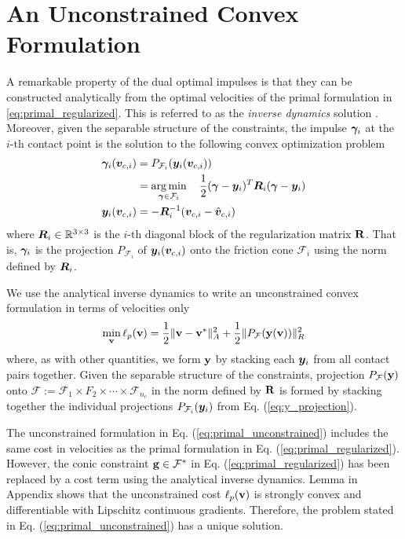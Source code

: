 \section{An Unconstrained Convex Formulation}
\label{sec:unconstrained_convex_formulation}

A remarkable property of the dual optimal impulses is that they
can be constructed analytically from the optimal velocities of the primal
formulation in \eqref{eq:primal_regularized}. This is referred to as the
\textit{inverse dynamics} solution \cite{bib:todorov2014}. Moreover, given the
separable structure of the constraints, the impulse ${\bm\gamma}_i$ at the
$i\text{-th}$ contact point is the solution to the following convex optimization
problem
\begin{equation}
	\begin{aligned}
	\bgamma_i(\vf{v}_{c,i})&= P_{\mathcal{F}_i}(\vf{y}_i(\vf{v}_{c,i}))\\
	&= \argmin_{\bgamma\in\mathcal{F}_i} \quad 
		\frac{1}{2}(\bgamma-\vf{y}_i)^T\vf{R}_i(\bgamma-\vf{y}_i)\\
	\vf{y}_i(\vf{v}_{c,i}) &= -\vf{R}_i^{-1}(\vf{v}_{c,i}-\hat{\vf{v}}_{c,i})	
	\end{aligned}
	\label{eq:y_projection}
\end{equation}
where ${\bm{R}}_i\in\mathbb{R}^{3\times3}$ is the $i\text{-th}$ diagonal block of
the regularization matrix ${\mathbf{R}}$. That is, ${\bm\gamma}_i$ is the projection
$P_{\mathcal{F}_i}$ of ${\bm{y}}_i({\bm{v}}_{c,i})$ onto the friction cone
$\mathcal{F}_i$ using the norm defined by ${\bm{R}}_i$.

We use the analytical inverse dynamics to write an unconstrained convex
formulation in terms of velocities only
\begin{eqnarray}
	\min_{\mf{v}} \ell_p(\mf{v}) = \frac{1}{2}\Vert\mf{v}-\mf{v}^*\Vert_{A}^2 +
	\frac{1}{2}\Vert P_\mathcal{F}(\mf{y}(\mf{v}))\Vert_R^2
	\label{eq:primal_unconstrained}
\end{eqnarray}
where, as with other quantities, we form ${\mathbf{y}}$ by stacking each
${\bm{y}}_i$ from all contact pairs together. Given the separable structure of the
constraints, projection $P_{\mathcal{F}}({\mathbf{y}})$ onto $\mathcal{F} :=
\mathcal{F}_1 \times F_2 \times \cdots \times \mathcal{F}_{n_c}$ in the norm
defined by ${\mathbf{R}}$ is formed by stacking together the individual projections
$P_{\mathcal{F}_i}({\bm{y}}_i)$ from Eq. (\ref{eq:y_projection}).

The unconstrained formulation in Eq. (\ref{eq:primal_unconstrained}) includes
the same cost in velocities as the primal formulation in Eq.
(\ref{eq:primal_regularized}). However, the conic constraint ${\mathbf{g}}\in
\mathcal{F}^*$ in Eq. (\ref{eq:primal_regularized}) has been replaced by a cost
term using the analytical inverse dynamics. Lemma
 in Appendix  shows
that the unconstrained cost $\ell_p({\mathbf{v}})$ is strongly convex and
differentiable with Lipschitz continuous gradients. Therefore, the problem
stated in Eq. (\ref{eq:primal_unconstrained}) has a unique solution.

